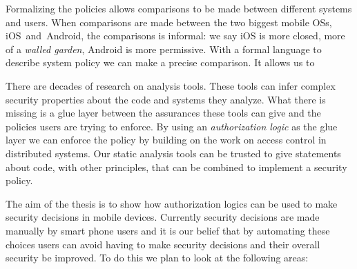 \documentclass[a4paper,sfsidenotes]{tufte-book}
\begin{document}
Formalizing the policies allows comparisons to be made between different systems
and users.  When comparisons are made between the two biggest mobile OSs,
iOS~and~Android, the comparisons is informal: we say iOS is more closed, more of
a \emph{walled garden}, Android is more permissive.  With a formal language to
describe system policy we can make a precise comparison.  It allows us to 

There are decades of research on analysis tools.  These tools can infer complex
security properties about the code and systems they analyze.  What there is
missing is a glue layer between the assurances these tools can give and the
policies users are trying to enforce.  By using an \emph{authorization logic} as
the glue layer we can enforce the policy by building on the work on access
control in distributed systems.  Our static analysis tools can be trusted to
give statements about code, with other principles, that can be combined to
implement a security policy.

The aim of the thesis is to show how authorization logics can be used to make
security decisions in mobile devices.  Currently security decisions are made
manually by smart phone users and it is our belief that by automating these
choices users can avoid having to make security decisions and their overall
security be improved.  To do this we plan to look at the following areas: 
\end{document}
